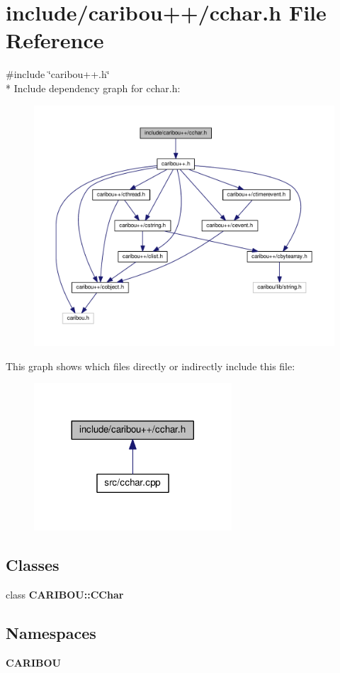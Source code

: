 \section{include/caribou++/cchar.h File Reference}
\label{cchar_8h}
{\ttfamily \#include \char`\"{}caribou++.\+h\char`\"{}}\\*
Include dependency graph for cchar.\+h\+:
\nopagebreak
\begin{figure}[H]
\begin{center}
\leavevmode
\includegraphics[width=350pt]{cchar_8h__incl}
\end{center}
\end{figure}
This graph shows which files directly or indirectly include this file\+:
\nopagebreak
\begin{figure}[H]
\begin{center}
\leavevmode
\includegraphics[width=209pt]{cchar_8h__dep__incl}
\end{center}
\end{figure}
\subsection*{Classes}
\begin{DoxyCompactItemize}
\item 
class {\bf C\+A\+R\+I\+B\+O\+U\+::\+C\+Char}
\end{DoxyCompactItemize}
\subsection*{Namespaces}
\begin{DoxyCompactItemize}
\item 
 {\bf C\+A\+R\+I\+B\+OU}
\end{DoxyCompactItemize}
